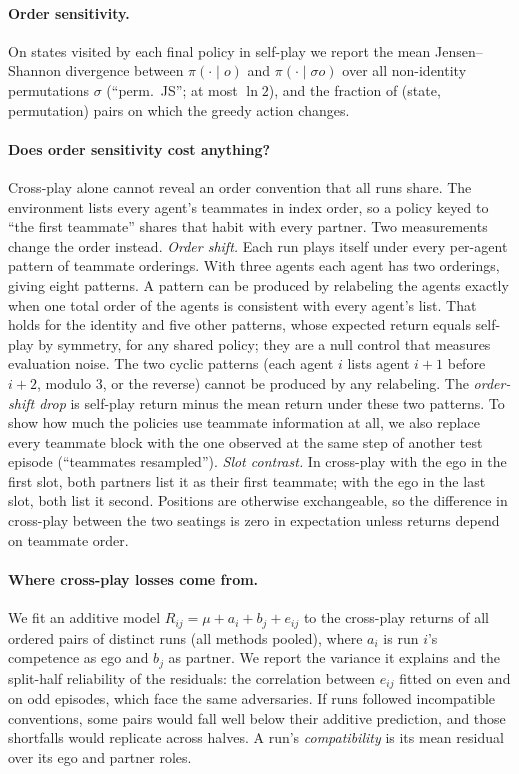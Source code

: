 \paragraph{Order sensitivity.}
On states visited by each final policy in self-play we report the mean
Jensen--Shannon divergence between $\pi(\cdot\mid o)$ and $\pi(\cdot\mid\sigma o)$
over all non-identity permutations $\sigma$ (``perm.\ JS''; at most $\ln 2$), and
the fraction of (state, permutation) pairs on which the greedy action changes.

\paragraph{Does order sensitivity cost anything?}
Cross-play alone cannot reveal an order convention that all runs share. The
environment lists every agent's teammates in index order, so a policy keyed to
``the first teammate'' shares that habit with every partner. Two measurements
change the order instead.
\emph{Order shift.} Each run plays itself under every per-agent pattern of
teammate orderings. With three agents each agent has two orderings, giving
eight patterns. A pattern can be produced by relabeling the agents exactly when
one total order of the agents is consistent with every agent's list. That holds
for the identity and five other patterns, whose expected return equals
self-play by symmetry, for any shared policy; they are a null control that
measures evaluation noise. The two cyclic patterns (each agent $i$ lists agent
$i{+}1$ before $i{+}2$, modulo 3, or the reverse) cannot be produced by any
relabeling. The \emph{order-shift drop} is self-play return minus the mean
return under these two patterns. To show how much the policies use teammate
information at all, we also replace every teammate block with the one observed
at the same step of another test episode (``teammates resampled'').
\emph{Slot contrast.} In cross-play with the ego in the first slot, both
partners list it as their first teammate; with the ego in the last slot, both
list it second. Positions are otherwise exchangeable, so the difference in
cross-play between the two seatings is zero in expectation unless returns
depend on teammate order.

\paragraph{Where cross-play losses come from.}
We fit an additive model $R_{ij} = \mu + a_i + b_j + e_{ij}$ to the cross-play
returns of all ordered pairs of distinct runs (all methods pooled), where $a_i$
is run $i$'s competence as ego and $b_j$ as partner. We report the variance it
explains and the split-half reliability of the residuals: the correlation
between $e_{ij}$ fitted on even and on odd episodes, which face the same
adversaries. If runs followed incompatible conventions, some pairs would fall
well below their additive prediction, and those shortfalls would replicate
across halves. A run's \emph{compatibility} is its mean residual over its ego
and partner roles.

